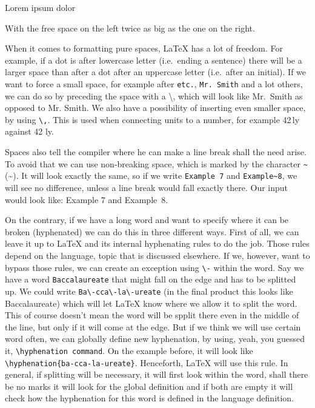 Lorem \hfill \hfill ipsum \hfill dolor

With the free space on the left twice as big as the one on the right.

When it comes to formatting pure spaces, \LaTeX{} has a lot of freedom. For example, if a dot is after lowercase letter (i.e.\ ending a sentence) there will be a larger space than after a dot after an uppercase letter (i.e.\ after an initial). If we want to force a small space, for example after \verb|etc.|, \verb|Mr. Smith| and a lot others, we can do so by preceding the space with a \textbackslash, which will look like Mr.\ Smith as opposed to Mr. Smith. We also have a possibility of inserting even smaller space, by using \verb|\,|. This is used when connecting units to a number, for example 42\,ly against 42 ly.

Spaces also tell the compiler where he can make a line break shall the need arise. To avoid that we can use non-breaking space, which is marked by the character \verb|~| (\textasciitilde{}). It will look exactly the same, so if we write \verb|Example 7| and \verb|Example~8|, we will see no difference, unless a line break would fall exactly there. Our input would look like: Example 7 and Example~8.

On the contrary, if we have a long word and want to specify where it can be broken (hyphenated) we can do this in three different ways. First of all, we can leave it up to \LaTeX{} and its internal hyphenating rules to do the job. Those rules depend on the language, topic that is discussed elsewhere. If we, however, want to bypass those rules, we can create an exception using \verb|\-| within the word. Say we have a word \verb|Baccalaureate| that might fall on the edge and has to be splitted up. We could write \verb|Ba\-cca\-la\-ureate| (in the final product this looks like Ba\-cca\-la\-ureate) which will let \LaTeX{} know where we allow it to split the word. This of course doesn't mean the word will be spplit there even in the middle of the line, but only if it will come at the edge. But if we think we will use certain word often, we can globally define new hyphenation, by using, yeah, you guessed it, \verb|\hyphenation command|. On the example before, it will look like \verb|\hyphenation{ba-cca-la-ureate}|. Henceforth, \LaTeX{} will use this rule. In general, if splitting will be necessary, it will first look within the word, shall there be no marks it will look for the global definition and if both are empty it will check how the hyphenation for this word is defined in the language definition.